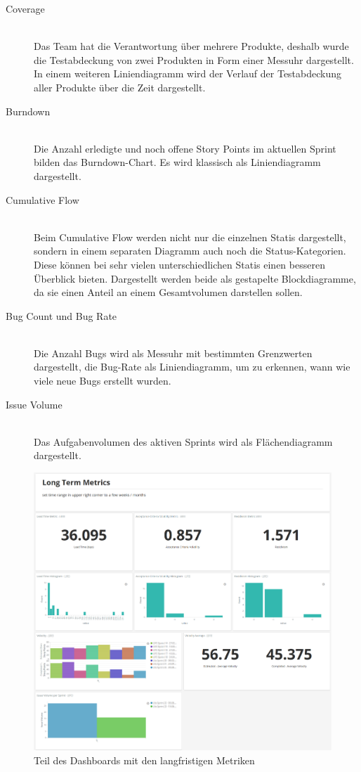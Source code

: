 \clearpage
\begin{description}
    \item[Coverage] \hfill \\ Das Team hat die Verantwortung über mehrere Produkte, deshalb wurde die Testabdeckung von zwei Produkten in Form einer Messuhr dargestellt. In einem weiteren Liniendiagramm wird der Verlauf der Testabdeckung aller Produkte über die Zeit dargestellt.
    \item[Burndown] \hfill \\ Die Anzahl erledigte und noch offene Story Points im aktuellen Sprint bilden das Burndown-Chart. Es wird klassisch als Liniendiagramm dargestellt.
    \item[Cumulative Flow] \hfill \\ Beim Cumulative Flow werden nicht nur die einzelnen Statis dargestellt, sondern in einem separaten Diagramm auch noch die Status-Kategorien. Diese können bei sehr vielen unterschiedlichen Statis einen besseren Überblick bieten. Dargestellt werden beide als gestapelte Blockdiagramme, da sie einen Anteil an einem Gesamtvolumen darstellen sollen.
    \item[Bug Count und Bug Rate] \hfill \\ Die Anzahl Bugs wird als Messuhr mit bestimmten Grenzwerten dargestellt, die Bug-Rate als Liniendiagramm, um zu erkennen, wann wie viele neue Bugs erstellt wurden.
    \item[Issue Volume] \hfill \\ Das Aufgabenvolumen des aktiven Sprints wird als Flächendiagramm dargestellt.
\end{description}

\begin{savenotes}
    \begin{figure}[H] 
        \centering
            \includegraphics[width=1.0\textwidth]{img/dashboard-long-term.png}
        \caption{Teil des Dashboards mit den langfristigen Metriken}\label{fig:dashboard-long-term}
    \end{figure}
\end{savenotes}

